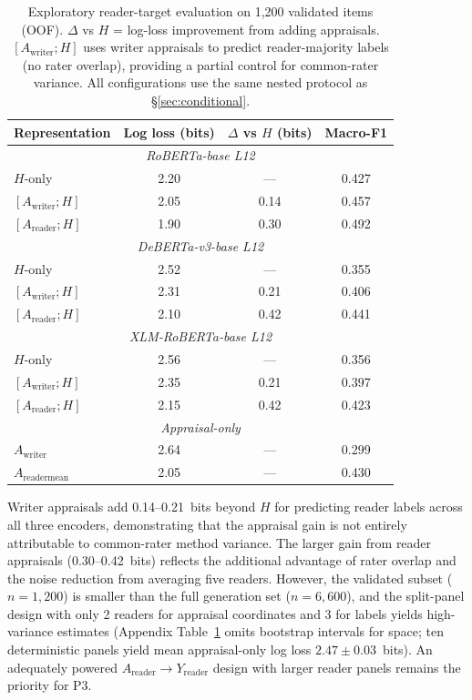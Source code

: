 \documentclass[11pt]{article}
\begin{document}
\begin{table}[h]
\centering\footnotesize
\begin{tabular}{lccc}
\toprule
Representation & Log loss (bits) & $\Delta$ vs $H$ (bits) & Macro-F1 \\
\midrule
\multicolumn{4}{c}{\textit{RoBERTa-base L12}} \\
$H$-only & 2.20 & --- & 0.427 \\
$[A_{\mathrm{writer}};H]$ & 2.05 & 0.14 & 0.457 \\
$[A_{\mathrm{reader}};H]$ & 1.90 & 0.30 & 0.492 \\
\midrule
\multicolumn{4}{c}{\textit{DeBERTa-v3-base L12}} \\
$H$-only & 2.52 & --- & 0.355 \\
$[A_{\mathrm{writer}};H]$ & 2.31 & 0.21 & 0.406 \\
$[A_{\mathrm{reader}};H]$ & 2.10 & 0.42 & 0.441 \\
\midrule
\multicolumn{4}{c}{\textit{XLM-RoBERTa-base L12}} \\
$H$-only & 2.56 & --- & 0.356 \\
$[A_{\mathrm{writer}};H]$ & 2.35 & 0.21 & 0.397 \\
$[A_{\mathrm{reader}};H]$ & 2.15 & 0.42 & 0.423 \\
\midrule
\multicolumn{4}{c}{\textit{Appraisal-only}} \\
$A_{\mathrm{writer}}$ & 2.64 & --- & 0.299 \\
$A_{\mathrm{reader mean}}$ & 2.05 & --- & 0.430 \\
\bottomrule
\end{tabular}
\caption{Exploratory reader-target evaluation on 1{,}200 validated items (OOF). $\Delta$ vs $H$ = log-loss improvement from adding appraisals. $[A_{\mathrm{writer}};H]$ uses writer appraisals to predict reader-majority labels (no rater overlap), providing a partial control for common-rater variance. All configurations use the same nested protocol as \S\ref{sec:conditional}.}
\label{tab:reader}
\end{table}

Writer appraisals add 0.14--0.21~bits beyond $H$ for predicting reader labels across all three encoders, demonstrating that the appraisal gain is not entirely attributable to common-rater method variance. The larger gain from reader appraisals (0.30--0.42~bits) reflects the additional advantage of rater overlap and the noise reduction from averaging five readers. However, the validated subset ($n=1{,}200$) is smaller than the full generation set ($n=6{,}600$), and the split-panel design with only 2 readers for appraisal coordinates and 3 for labels yields high-variance estimates (Appendix Table~\ref{tab:reader} omits bootstrap intervals for space; ten deterministic panels yield mean appraisal-only log loss $2.47\pm0.03$~bits). An adequately powered $A_{\mathrm{reader}}\!\to\!Y_{\mathrm{reader}}$ design with larger reader panels remains the priority for P3.
\end{document}
